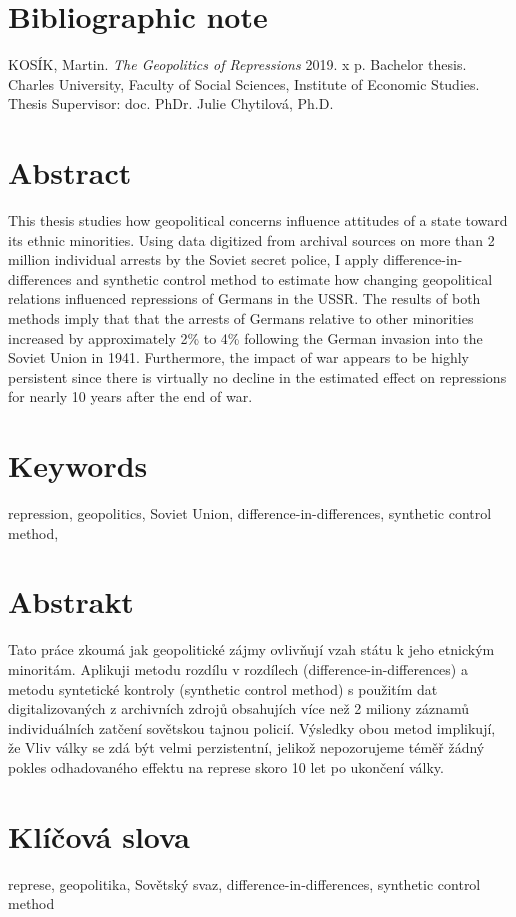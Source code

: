 \pagestyle{empty}

\section*{Bibliographic note}

\noindent KOSÍK, Martin. \textit{The Geopolitics of Repressions}  2019. x p.
Bachelor thesis. Charles University, Faculty of Social Sciences, Institute of Economic Studies. Thesis Supervisor: doc. PhDr. Julie Chytilová, Ph.D. \\

\section*{Abstract}
  This thesis studies how geopolitical concerns influence attitudes of a state toward its ethnic minorities.
    Using  data digitized from archival sources on  more than 2 million individual arrests by the Soviet secret police, I apply difference-in-differences and synthetic control method to estimate how changing geopolitical relations influenced repressions of Germans in the USSR. 
    The results of both methods imply that that the arrests of Germans relative to other minorities increased by approximately 2\% to 4\% following the German invasion into the Soviet Union in 1941. 
    Furthermore, the impact of war  appears to be highly persistent since there is virtually  no decline in the estimated effect on repressions for nearly 10 years after the end of war.

\section*{Keywords}
repression, geopolitics, Soviet Union, difference-in-differences, synthetic control method, \\
\newpage
\section*{Abstrakt}
Tato práce zkoumá jak geopolitické zájmy ovlivňují vzah státu k jeho etnickým minoritám. 
Aplikuji metodu rozdílu v rozdílech (difference-in-differences) a metodu syntetické kontroly (synthetic control method) s použitím  dat digitalizovaných z archivních zdrojů obsahujích více než 2 miliony záznamů individuálních zatčení sovětskou tajnou policií.  
Výsledky obou metod implikují, že 
Vliv války  se zdá být velmi perzistentní, jelikož nepozorujeme téměř  žádný pokles odhadovaného effektu na represe skoro 10 let po ukončení války. 

\section*{Klíčová slova}
represe, geopolitika, Sovětský svaz, difference-in-differences, synthetic control method\\

\newpage
